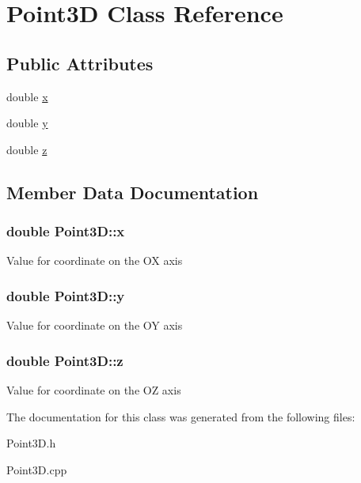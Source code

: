 \hypertarget{class_point3_d}{\section{Point3\+D Class Reference}
\label{class_point3_d}
}
\subsection*{Public Attributes}
\begin{DoxyCompactItemize}
\item 
double \hyperlink{class_point3_d_abf9d1f564d599503cdb114934c7044b7}{x}
\item 
double \hyperlink{class_point3_d_abcb44b06e310b076fa9d65dec8541dd4}{y}
\item 
double \hyperlink{class_point3_d_a9f4a32e3afccb3c9fe9b5cd88e179c3d}{z}
\end{DoxyCompactItemize}


\subsection{Member Data Documentation}
\hypertarget{class_point3_d_abf9d1f564d599503cdb114934c7044b7}{
\subsubsection[{x}]{\setlength{\rightskip}{0pt plus 5cm}double Point3\+D\+::x}}\label{class_point3_d_abf9d1f564d599503cdb114934c7044b7}
Value for coordinate on the O\+X axis \hypertarget{class_point3_d_abcb44b06e310b076fa9d65dec8541dd4}{
\subsubsection[{y}]{\setlength{\rightskip}{0pt plus 5cm}double Point3\+D\+::y}}\label{class_point3_d_abcb44b06e310b076fa9d65dec8541dd4}
Value for coordinate on the O\+Y axis \hypertarget{class_point3_d_a9f4a32e3afccb3c9fe9b5cd88e179c3d}{
\subsubsection[{z}]{\setlength{\rightskip}{0pt plus 5cm}double Point3\+D\+::z}}\label{class_point3_d_a9f4a32e3afccb3c9fe9b5cd88e179c3d}
Value for coordinate on the O\+Z axis 

The documentation for this class was generated from the following files\+:\begin{DoxyCompactItemize}
\item 
Point3\+D.\+h\item 
Point3\+D.\+cpp\end{DoxyCompactItemize}
